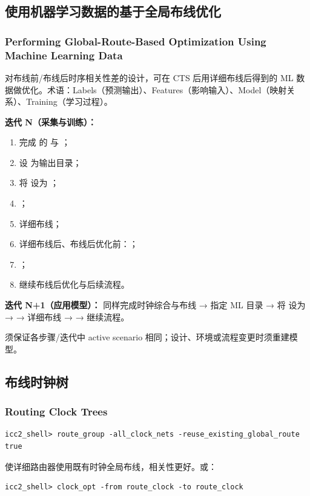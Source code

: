 \subsection{使用机器学习数据的基于全局布线优化}
\subsubsection*{Performing Global-Route-Based Optimization Using Machine Learning Data}

对布线前/布线后时序相关性差的设计，可在 CTS 后用详细布线后得到的 ML 数据做优化。术语：Labels（预测输出）、Features（影响输入）、Model（映射关系）、Training（学习过程）。

\textbf{迭代 N（采集与训练）：}
\begin{enumerate}
  \item 完成  的  与 ；
  \item 设  为输出目录；
  \item 将  设为 ；
  \item {}；
  \item 详细布线；
  \item 详细布线后、布线后优化前：；
  \item {}；
  \item 继续布线后优化与后续流程。
\end{enumerate}

\textbf{迭代 N+1（应用模型）：} 同样完成时钟综合与布线 → 指定 ML 目录 → 将  设为  →  → 详细布线 →  → 继续流程。

须保证各步骤/迭代中 active scenario 相同；设计、环境或流程变更时须重建模型。

\subsection{布线时钟树}
\subsubsection*{Routing Clock Trees}

\begin{lstlisting}
icc2_shell> route_group -all_clock_nets -reuse_existing_global_route true
\end{lstlisting}
 使详细路由器使用既有时钟全局布线，相关性更好。或：
\begin{lstlisting}
icc2_shell> clock_opt -from route_clock -to route_clock
\end{lstlisting}

